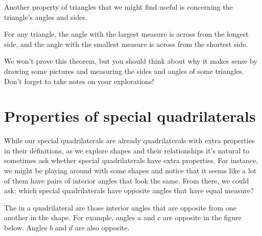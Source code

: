 \documentclass{ximera}
\begin{document}
Another property of triangles that we might find useful is concerning the triangle's angles and sides.
\begin{theorem}
For any triangle, the angle with the largest measure is across from the longest side, and the angle with the smallest measure is across from the shortest side.
\end{theorem}
We won't prove this theorem, but you should think about why it makes sense by drawing some pictures and measuring the sides and angles of some triangles. Don't forget to take notes on your explorations!


\section{Properties of special quadrilaterals}

While our special quadrilaterals are already quadrilaterals with extra properties in their definitions, as we explore shapes and their relationships it's natural to sometimes ask whether special quadrilaterals have extra properties. For instance, we might be playing around with some shapes and notice that it seems like a lot of them have pairs of interior angles that look the same. From there, we could ask: which special quadrilaterals have opposite angles that have equal measure?
\begin{definition}
The  in a quadrilateral are those interior angles that are opposite from one another in the shape. For example, angles $a$ and $c$ are opposite in the figure below. Angles $b$ and $d$ are also opposite.
\begin{center}
\end{center}
\end{definition}
\end{document}
